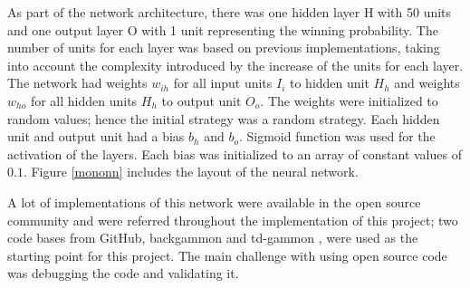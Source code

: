 \documentclass[12pt,a4paper]{article}
\begin{document}
As part of the network architecture, there was one hidden layer H with 50 units and one output layer O with 1 unit representing the winning probability. The number of units for each layer was based on previous implementations, taking into account the complexity introduced by the increase of the units for each layer. The network had weights $w_{ih}$ for all input units $I_i$ to hidden unit $H_h$ and weights $w_{ho}$ for all hidden units $H_h$ to output unit $O_o$. The weights were initialized to random values; hence the initial strategy was a random strategy. Each hidden unit and output unit had a bias $b_h$ and $b_o$. Sigmoid function was used for the activation of the layers. Each bias was initialized to an array of constant values of $0.1$. Figure \ref{mononn} includes the layout of the neural network.

A lot of implementations of this network were available in the open source community and were referred throughout the implementation of this project; two code bases from GitHub, backgammon \cite{awni} and td-gammon \cite{fomorians}, were used as the starting point for this project. The main challenge with using open source code was debugging the code and validating it.
\end{document}
